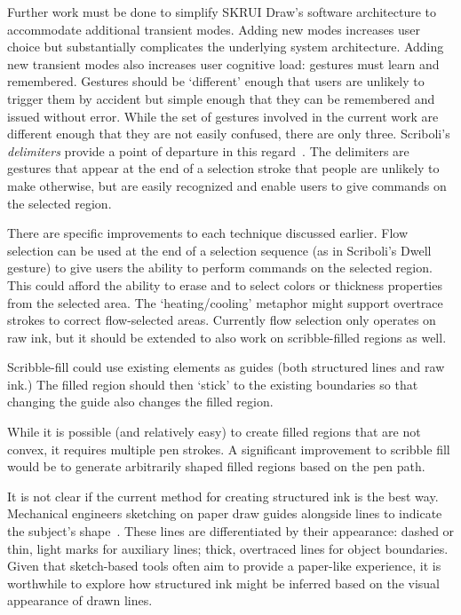 \documentclass{egpubl}
\begin{document}
Further work must be done to simplify SKRUI Draw's software
architecture to accommodate additional transient modes. Adding new
modes increases user choice but substantially complicates the
underlying system architecture. Adding new transient modes also
increases user cognitive load: gestures must learn and
remembered. Gestures should be `different' enough that users are
unlikely to trigger them by accident but simple enough that they can
be remembered and issued without error. While the set of gestures
involved in the current work are different enough that they are not
easily confused, there are only three. Scriboli's \emph{delimiters}
provide a point of departure in this
regard~\cite{hinckley-scriboli}. The delimiters are gestures that
appear at the end of a selection stroke that people are unlikely to
make otherwise, but are easily recognized and enable users to give
commands on the selected region.

There are specific improvements to each technique discussed
earlier. Flow selection can be used at the end of a selection sequence
(as in Scriboli's Dwell gesture) to give users the ability to perform
commands on the selected region. This could afford the ability to
erase and to select colors or thickness properties from the selected
area. The `heating/cooling' metaphor might support overtrace strokes
to correct flow-selected areas. Currently flow selection only operates
on raw ink, but it should be extended to also work on scribble-filled
regions as well.

Scribble-fill could use existing elements as guides (both structured
lines and raw ink.) The filled region should then `stick' to the
existing boundaries so that changing the guide also changes the filled
region.

While it is possible (and relatively easy) to create filled regions
that are not convex, it requires multiple pen strokes. A significant
improvement to scribble fill would be to generate arbitrarily shaped
filled regions based on the pen path.

It is not clear if the current method for creating structured ink is
the best way. Mechanical engineers sketching on paper draw guides
alongside lines to indicate the subject's
shape~\cite{company-modes}. These lines are differentiated by their
appearance: dashed or thin, light marks for auxiliary lines; thick,
overtraced lines for object boundaries. Given that sketch-based tools
often aim to provide a paper-like experience, it is worthwhile to
explore how structured ink might be inferred based on the visual
appearance of drawn lines.
\end{document}
